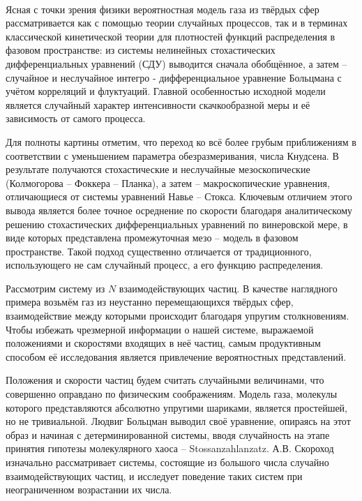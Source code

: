 \
\vzmscaption



Ясная с точки зрения физики вероятностная модель газа из твёрдых сфер рассматривается как с помощью теории случайных процессов, так и в терминах классической кинетической теории для плотностей функций распределения в фазовом пространстве: из системы нелинейных  стохастических дифференциальных уравнений (СДУ) выводится сначала обобщённое, а затем -- случайное и неслучайное интегро - дифференциальное уравнение Больцмана с учётом корреляций и флуктуаций. Главной особенностью исходной модели является случайный характер интенсивности скачкообразной меры и её зависимость от самого процесса.

Для полноты картины  отметим, что переход ко всё более грубым приближениям  в соответствии с уменьшением параметра обезразмеривания,  числа Кнудсена. В результате получаются стохастические и неслучайные мезоскопические (Колмогорова -- Фоккера -- Планка), а затем -- макроскопические уравнения, отличающиеся от  системы уравнений Навье -- Стокса. Ключевым отличием этого вывода является  более точное осреднение по скорости  благодаря  аналитическому решению стохастических дифференциальных уравнений по винеровской мере, в виде которых  представлена промежуточная мезо -- модель в фазовом пространстве. Такой подход существенно отличается от традиционного, использующего не сам случайный процесс, а его функцию распределения.

Рассмотрим систему из $N$ взаимодействующих частиц. В качестве наглядного примера возьмём газ из неустанно перемещающихся твёрдых сфер, взаимодействие между которыми происходит благодаря упругим столкновениям. Чтобы избежать чрезмерной информации  о нашей системе, выражаемой положениями и скоростями входящих в неё частиц, самым продуктивным способом её исследования является привлечение вероятностных представлений.


Положения и скорости частиц будем считать случайными величинами, что совершенно оправдано по  физическим соображениям.
Модель газа, молекулы которого представляются абсолютно упругими шариками, является простейшей, но не
тривиальной. Людвиг Больцман выводил своё
уравнение, опираясь на этот образ и начиная с детерминированной системы, вводя случайность на этапе принятия гипотезы молекулярного хаоса – Stossanzahlanzatz.
А.В. Скороход изначально рассматривает системы, состоящие из большого числа случайно взаимодействующих
частиц, и исследует поведение таких систем при неограниченном возрастании их числа.

